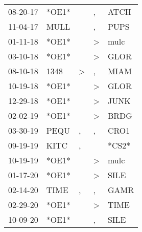\begin{supertabular}{p{0.07\textwidth}p{0.06\textwidth}p{0.02\textwidth}p{0.02\textwidth}p{0.06\textwidth}}
 08-20-17\textsuperscript{} &                   *OE1* &               &             , &           ATCH\textsuperscript{} \\
 11-04-17\textsuperscript{} &  MULL\textsuperscript{} &               &             , &           PUPS\textsuperscript{} \\
 01-11-18\textsuperscript{} &                   *OE1* &               &  \textgreater &           mulc\textsuperscript{} \\
 03-10-18\textsuperscript{} &                   *OE1* &               &  \textgreater &           GLOR\textsuperscript{} \\
 08-10-18\textsuperscript{} &  1348\textsuperscript{} &  \textgreater &             , &           MIAM\textsuperscript{} \\
 10-19-18\textsuperscript{} &                   *OE1* &               &  \textgreater &           GLOR\textsuperscript{} \\
 12-29-18\textsuperscript{} &                   *OE1* &               &  \textgreater &           JUNK\textsuperscript{} \\
 02-02-19\textsuperscript{} &                   *OE1* &               &  \textgreater &           BRDG\textsuperscript{} \\
 03-30-19\textsuperscript{} &  PEQU\textsuperscript{} &             , &             , &           CRO1\textsuperscript{} \\
 09-19-19\textsuperscript{} &  KITC\textsuperscript{} &             , &               &                            *CS2* \\
 10-19-19\textsuperscript{} &                   *OE1* &               &  \textgreater &           mulc\textsuperscript{} \\
 01-17-20\textsuperscript{} &                   *OE1* &               &  \textgreater &           SILE\textsuperscript{} \\
 02-14-20\textsuperscript{} &  TIME\textsuperscript{} &             , &             , &           GAMR\textsuperscript{} \\
 02-29-20\textsuperscript{} &                   *OE1* &               &  \textgreater &           TIME\textsuperscript{} \\
 10-09-20\textsuperscript{} &                   *OE1* &               &             , &           SILE\textsuperscript{} \\
\end{supertabular}
